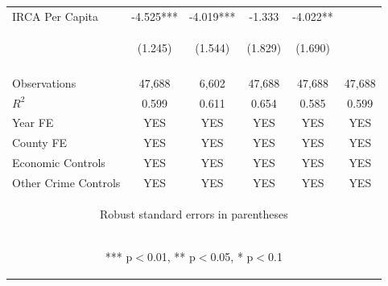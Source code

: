 \begin{center}
\begin{tabular}{lccccc}
IRCA Per Capita & -4.525*** & -4.019*** & -1.333 & -4.022** &  \\
 & \begin{footnotesize}(1.245)\end{footnotesize} & \begin{footnotesize}(1.544)\end{footnotesize} & \begin{footnotesize}(1.829)\end{footnotesize} & \begin{footnotesize}(1.690)\end{footnotesize} & \begin{footnotesize}\end{footnotesize} \\
\vspace{4pt} & \begin{footnotesize}\end{footnotesize} & \begin{footnotesize}\end{footnotesize} & \begin{footnotesize}\end{footnotesize} & \begin{footnotesize}\end{footnotesize} & \begin{footnotesize}\end{footnotesize} \\
Observations & 47,688 & 6,602 & 47,688 & 47,688 & 47,688 \\
$R^2$ & 0.599 & 0.611 & 0.654 & 0.585 & 0.599 \\
Year FE & YES & YES & YES & YES & YES \\
County FE & YES & YES & YES & YES & YES \\
Economic Controls & YES & YES & YES & YES & YES \\
 Other Crime Controls & YES & YES & YES & YES & YES \\ \hline
\multicolumn{6}{c}{\begin{footnotesize} Robust standard errors in parentheses\end{footnotesize}} \\
\multicolumn{6}{c}{\begin{footnotesize} *** p$<$0.01, ** p$<$0.05, * p$<$0.1\end{footnotesize}} \\
\end{tabular}
\end{center}
